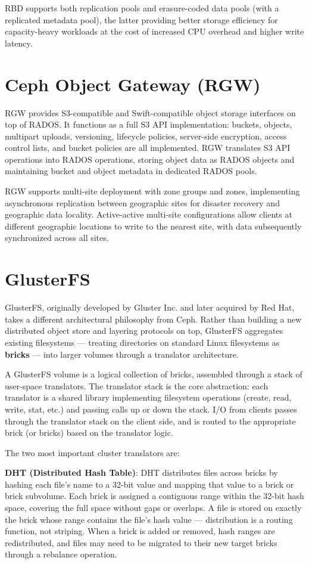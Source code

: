 RBD supports both replication pools and erasure-coded data pools (with a replicated metadata pool), the latter providing better storage efficiency for capacity-heavy workloads at the cost of increased CPU overhead and higher write latency.

\section{Ceph Object Gateway (RGW)}
RGW provides S3-compatible and Swift-compatible object storage interfaces on top of RADOS. It functions as a full S3 API implementation: buckets, objects, multipart uploads, versioning, lifecycle policies, server-side encryption, access control lists, and bucket policies are all implemented. RGW translates S3 API operations into RADOS operations, storing object data as RADOS objects and maintaining bucket and object metadata in dedicated RADOS pools.

RGW supports multi-site deployment with zone groups and zones, implementing asynchronous replication between geographic sites for disaster recovery and geographic data locality. Active-active multi-site configurations allow clients at different geographic locations to write to the nearest site, with data subsequently synchronized across all sites.

\section{GlusterFS}
GlusterFS, originally developed by Gluster Inc. and later acquired by Red Hat, takes a different architectural philosophy from Ceph. Rather than building a new distributed object store and layering protocols on top, GlusterFS aggregates existing filesystems --- treating directories on standard Linux filesystems as \textbf{bricks} --- into larger volumes through a translator architecture.

A GlusterFS volume is a logical collection of bricks, assembled through a stack of user-space translators. The translator stack is the core abstraction: each translator is a shared library implementing filesystem operations (create, read, write, stat, etc.) and passing calls up or down the stack. I/O from clients passes through the translator stack on the client side, and is routed to the appropriate brick (or bricks) based on the translator logic.

The two most important cluster translators are:

\textbf{DHT (Distributed Hash Table)}: DHT distributes files across bricks by hashing each file's name to a 32-bit value and mapping that value to a brick or brick subvolume. Each brick is assigned a contiguous range within the 32-bit hash space, covering the full space without gaps or overlaps. A file is stored on exactly the brick whose range contains the file's hash value --- distribution is a routing function, not striping. When a brick is added or removed, hash ranges are redistributed, and files may need to be migrated to their new target bricks through a rebalance operation.

